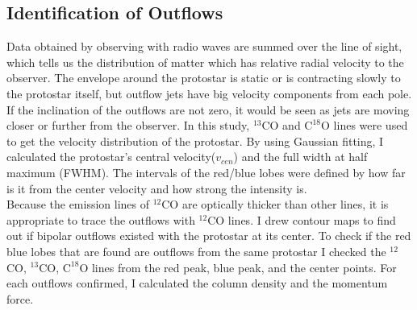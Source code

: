 \subsection{Identification of Outflows}
Data obtained by observing with radio waves are summed over the line of sight, which tells us the distribution of matter which has relative radial velocity to the observer. The envelope around the protostar is static or is contracting slowly to the protostar itself, but outflow jets have big velocity components from each pole. If the inclination of the outflows are not zero, it would be seen as jets are moving closer or further from the observer. In this study, $^{13}$CO and $\textrm{C}^{18}\textrm{O}$ lines were used to get the velocity distribution of the protostar. By using Gaussian fitting, I calculated the protostar’s central velocity($v_{cen}$) and the full width at half maximum (FWHM). The intervals of the red/blue lobes were defined by how far is it from the center velocity and how strong the intensity is. \\
Because the emission lines of $^{12}$CO are optically thicker than other lines, it is appropriate to trace the outflows with $^{12}$CO lines. I drew contour maps to find out if bipolar outflows existed with the protostar at its center. To check if the red blue lobes that are found are outflows from the same protostar I checked the $^{12}$CO, $^{13}$CO, $\textrm{C}^{18}\textrm{O}$ lines from the red peak, blue peak, and the center points. For each outflows confirmed, I calculated the column density and the momentum force.